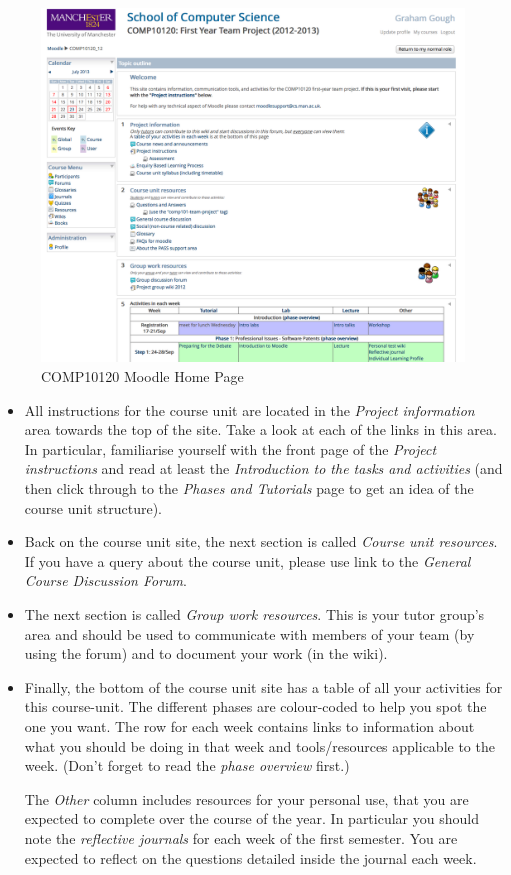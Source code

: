 \begin{figure}
\centerline{\includegraphics[width=15cm]{images/101-moodle-page}}
\caption{COMP10120 Moodle Home Page}\label{figure:101-moodle-page}
\end{figure}


\begin{itemize}
\item 
All instructions for the course unit are located in the \emph{Project information} area towards the top of the site. Take a look at each of the links in this area. In particular, familiarise yourself with the front page of the \emph{Project instructions} and read at least the \emph{Introduction to the tasks and activities} (and then click through to the \emph{Phases and Tutorials} page to get an idea of the course unit structure).

\item Back on the course unit site, the next section is called \emph{Course unit resources}. If you have a query about the course unit, please use link to the \emph{General Course Discussion Forum}.

\item The next section is called \emph{Group work resources}. This is your tutor group's area and should be used to communicate with members of your team (by using the forum) and to document your work (in the wiki).

\item Finally, the bottom of the course unit site has a table of all your activities for this course-unit. The different phases are colour-coded to help you spot the one you want. The row for each week contains links to information about what you should be doing in that week and tools/resources applicable to the week. (Don't forget to read the \emph{phase overview} first.)

  The \emph{Other}  column includes resources for your personal use, that you are expected to complete over the course of the year. In particular you should note the \emph{reflective journals} for each week of the first semester. You are expected to reflect on the questions detailed inside the journal each week.
\end{itemize}

